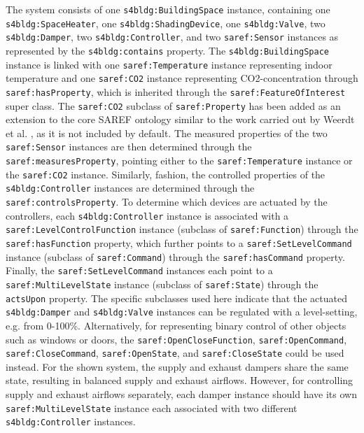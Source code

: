 The system consists of one \texttt{s4bldg:BuildingSpace} instance, containing one \texttt{s4bldg:SpaceHeater}, one \texttt{s4bldg:ShadingDevice}, one \texttt{s4bldg:Valve}, two \texttt{s4bldg:Damper}, two \texttt{s4bldg:Controller}, and two \texttt{saref:Sensor} instances as represented by the \texttt{s4bldg:contains} property. The \texttt{s4bldg:BuildingSpace} instance is linked with one \texttt{saref:Temperature} instance representing indoor temperature and one \texttt{saref:CO2} instance representing CO2-concentration through \texttt{saref:hasProperty}, which is inherited through the \texttt{saref:FeatureOfInterest} super class. The \texttt{saref:CO2} subclass of \texttt{saref:Property} has been added as an extension to the core SAREF ontology similar to the work carried out by Weerdt et al. \cite{Weerdt2021}, as it is not included by default. The measured properties of the two \texttt{saref:Sensor} instances are then determined through the \texttt{saref:measuresProperty}, pointing either to the \texttt{saref:Temperature} instance or the \texttt{saref:CO2} instance. Similarly, fashion, the controlled properties of the \texttt{s4bldg:Controller} instances are determined through the \texttt{saref:controlsProperty}. To determine which devices are actuated by the controllers, each \texttt{s4bldg:Controller} instance is associated with a \texttt{saref:LevelControlFunction} instance (subclass of \texttt{saref:Function}) through the \texttt{saref:hasFunction} property, which further points to a \texttt{saref:SetLevelCommand} instance (subclass of \texttt{saref:Command}) through the \texttt{saref:hasCommand} property. Finally, the \texttt{saref:SetLevelCommand} instances each point to a \texttt{saref:MultiLevelState} instance (subclass of \texttt{saref:State}) through the \texttt{actsUpon} property. The specific subclasses used here indicate that the actuated \texttt{s4bldg:Damper} and \texttt{s4bldg:Valve} instances can be regulated with a level-setting, e.g. from 0-100\%. Alternatively, for representing binary control of other objects such as windows or doors, the \texttt{saref:OpenCloseFunction}, \texttt{saref:OpenCommand}, \texttt{saref:CloseCommand}, \texttt{saref:OpenState}, and \texttt{saref:CloseState} could be used instead. For the shown system, the supply and exhaust dampers share the same state, resulting in balanced supply and exhaust airflows. However, for controlling supply and exhaust airflows separately, each damper instance should have its own \texttt{saref:MultiLevelState} instance each associated with two different \texttt{s4bldg:Controller} instances. 

